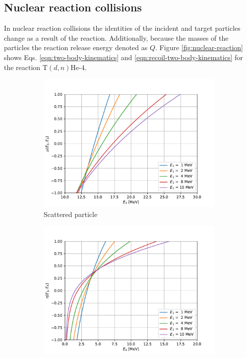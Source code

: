 \documentclass[../main.tex]{subfiles}
\begin{document}
\subsection{Nuclear reaction collisions}
In nuclear reaction collisions the identities of the incident and target particles change as a result of the reaction. Additionally, because the masses of the particles the reaction release energy denoted as $Q$. Figure \ref{fig:nuclear-reaction} shows Eqs. \eqref{eqn:two-body-kinematics} and \eqref{eqn:recoil-two-body-kinematics} for the reaction $\text{T}(d,n)\text{He-4}$.
\begin{figure}[!htb]
  \centering
  \begin{subfigure}{.5\textwidth}
    \centering
    \includegraphics[width=\linewidth]{../figures/particle_kinematics/light_rx_energy_angle.pdf}
    \caption{Scattered particle}
    \label{fig:nuclear-reaction-scattered}
  \end{subfigure}%
  \begin{subfigure}{.5\textwidth}
    \centering
    \includegraphics[width=\linewidth]{../figures/particle_kinematics/light_rx_recoil_energy_angle.pdf}

\end{subfigure}
\end{figure}
\end{document}

